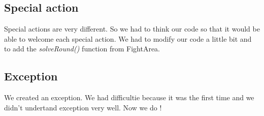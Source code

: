\subsection{Special action}

Special actions are very different. So we had to think our code so that it would be able to welcome each special action.
We had to modify our code a little bit and to add the \textit{solveRound()} function from FightArea. 

\subsection{Exception}

We created an exception. We had difficultie because it was the first time and we didn't undertand exception very well.
Now we do !


